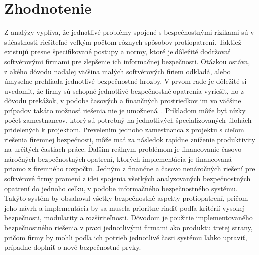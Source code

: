 \section{Zhodnotenie}\label{sec:podsekcia-3}

\par Z analýzy vyplíva, že jednotlivé problémy spojené s bezpečnostnými rizikami sú v súčastnosti riešiteľné veľkým počtom
rôznych spôsobov protiopatrení. Taktiež existujú presne špecifikované postupy a normy, ktoré je dôležité dodržovať
softvérovými firmami pre zlepšenie ich informačnej bezpečnosti. Otázkou ostáva, z akého dôvodu naďalej väčšina malých
softvérových firiem odkladá, alebo úmyselne prehliada jednotlivé bezpečnostné hrozby. V prvom rade je dôležité si uvedomiť,
že firmy sú schopné jednotlivé bezpečnostné opatrenia vyriešiť, no z dôvodu prekážok, v podobe časových a finančných
prostriedkov im vo väčšine prípadov takáto možnosť riešenia nie je umožnená~\cite{CompanySecurity}. Príkladom môže byť nízky počet zamestnancov,
ktorý sú potrebný na jednotlivých špecializovaných úlohách  pridelených k projektom. Prevelením jednoho zamestnanca z
projektu s cieľom riešenia firemnej bezpečnosti, môže mať za následok rapídne zníženie produktivity na určitých častiach práce. Ďalším reálnym
problémom je financovanie časovo náročných bezpečnostných opatrení, ktorých implementácia je financovaná priamo z firemného
rozpočtu. Jedným z finančne a časovo nenáročných riešení pre softvérové firmy pramení z idei spojenia všetkých analyzovaných
bezpečnostných opatrení do jednoho celku, v podobe informačného bezpečnostného systému. Takýto systém by obsahoval všetky
bezpečnostné aspekty protiopatrení, pričom jeho návrh a implementácia by sa musela prioritne riadiť podľa kritérií vysokej
bezpečnosti, modularity a rozšíriteľnosti. Dôvodom je použitie implementovaného bezpečnostného riešenia v praxi jednotlivými
firmami ako produktu tretej strany, pričom firmy by mohli podľa ich potrieb jednotlivé časti systému ľahko upraviť, prípadne
doplniť o nové bezpečnostné prvky.
